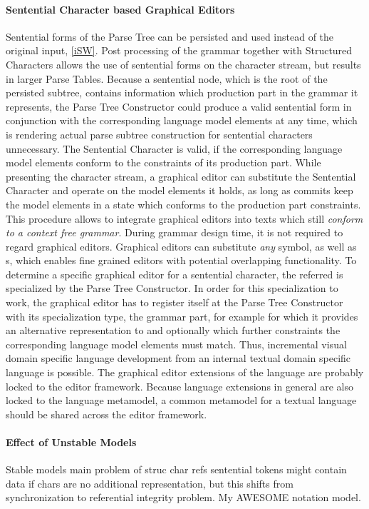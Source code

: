\paragraph{Sentential Character based Graphical Editors}
Sentential forms of the Parse Tree can be persisted and used instead of the original input, \ref{iSW}. Post processing of the grammar together with Structured Characters allows the use of sentential forms on the character stream, but results in larger Parse Tables. Because a sentential node, which is the root of the persisted subtree, contains information which production part in the grammar it represents, the Parse Tree Constructor could produce a valid sentential form in conjunction with the corresponding language model elements at any time, which is rendering actual parse subtree construction for sentential characters unnecessary. The Sentential Character is valid, if the corresponding language model elements conform to the constraints of its production part. While presenting the character stream, a graphical editor can substitute the Sentential Character and operate on the model elements it holds, as long as commits keep the model elements in a state which conforms to the production part constraints. This procedure allows to integrate graphical editors into texts which still \emph{conform to a context free grammar}. During grammar design time, it is not required to regard graphical editors. Graphical editors can substitute \emph{any} symbol, as well as s, which enables fine grained editors with potential overlapping functionality. To determine a specific graphical editor for a sentential character, the referred  is specialized by the Parse Tree Constructor. In order for this specialization to work, the graphical editor has to register itself at the Parse Tree Constructor with its specialization type, the grammar part, for example for which  it provides an alternative representation to and optionally which further constraints the corresponding language model elements must match. Thus, incremental visual domain specific language development from an internal textual domain specific language is possible. The graphical editor extensions of the language are probably locked to the editor framework. Because language extensions in general are also locked to the language metamodel, a common metamodel for a textual language should be shared across the editor framework.


\paragraph{Effect of Unstable Models}
Stable models main problem
of struc char refs
 sentential tokens might contain data if chars are no additional representation, but this shifts from synchronization to referential integrity problem. My AWESOME notation model.


